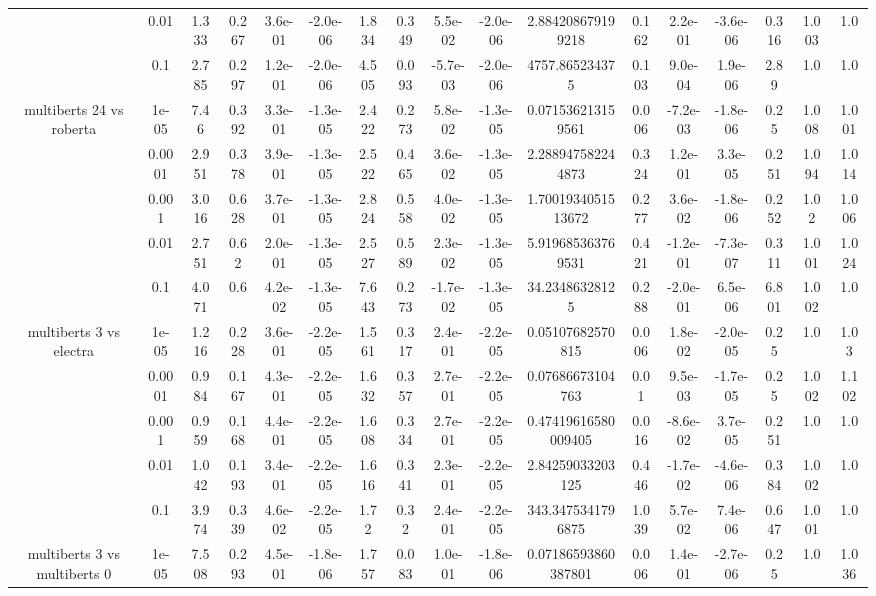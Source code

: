 \begin{tabular}{|c|c|c|c|c|c|c|c|c|c|c|c|c|c|c|c|c|}
 & 0.01 & 1.333 & 0.267 & 3.6e-01 & -2.0e-06 & 1.834 & 0.349 & 5.5e-02 & -2.0e-06 & 2.884208679199218 & 0.162 & 2.2e-01 & -3.6e-06 & 0.316 & 1.003 & 1.0 \\
 & 0.1 & 2.785 & 0.297 & 1.2e-01 & -2.0e-06 & 4.505 & 0.093 & -5.7e-03 & -2.0e-06 & 4757.865234375 & 0.103 & 9.0e-04 & 1.9e-06 & 2.89 & 1.0 & 1.0 \\
\hline
\multirow{5}{*}{multiberts 24 vs roberta } & 1e-05 & 7.46 & 0.392 & 3.3e-01 & -1.3e-05 & 2.422 & 0.273 & 5.8e-02 & -1.3e-05 & 0.071536213159561 & 0.006 & -7.2e-03 & -1.8e-06 & 0.25 & 1.008 & 1.001 \\
 & 0.0001 & 2.951 & 0.378 & 3.9e-01 & -1.3e-05 & 2.522 & 0.465 & 3.6e-02 & -1.3e-05 & 2.288947582244873 & 0.324 & 1.2e-01 & 3.3e-05 & 0.251 & 1.094 & 1.014 \\
 & 0.001 & 3.016 & 0.628 & 3.7e-01 & -1.3e-05 & 2.824 & 0.558 & 4.0e-02 & -1.3e-05 & 1.7001934051513672 & 0.277 & 3.6e-02 & -1.8e-06 & 0.252 & 1.02 & 1.006 \\
 & 0.01 & 2.751 & 0.62 & 2.0e-01 & -1.3e-05 & 2.527 & 0.589 & 2.3e-02 & -1.3e-05 & 5.919685363769531 & 0.421 & -1.2e-01 & -7.3e-07 & 0.311 & 1.001 & 1.024 \\
 & 0.1 & 4.071 & 0.6 & 4.2e-02 & -1.3e-05 & 7.643 & 0.273 & -1.7e-02 & -1.3e-05 & 34.23486328125 & 0.288 & -2.0e-01 & 6.5e-06 & 6.801 & 1.002 & 1.0 \\
\hline
\multirow{5}{*}{multiberts 3 vs electra } & 1e-05 & 1.216 & 0.228 & 3.6e-01 & -2.2e-05 & 1.561 & 0.317 & 2.4e-01 & -2.2e-05 & 0.05107682570815 & 0.006 & 1.8e-02 & -2.0e-05 & 0.25 & 1.0 & 1.03 \\
 & 0.0001 & 0.984 & 0.167 & 4.3e-01 & -2.2e-05 & 1.632 & 0.357 & 2.7e-01 & -2.2e-05 & 0.07686673104763 & 0.01 & 9.5e-03 & -1.7e-05 & 0.25 & 1.002 & 1.102 \\
 & 0.001 & 0.959 & 0.168 & 4.4e-01 & -2.2e-05 & 1.608 & 0.334 & 2.7e-01 & -2.2e-05 & 0.47419616580009405 & 0.016 & -8.6e-02 & 3.7e-05 & 0.251 & 1.0 & 1.0 \\
 & 0.01 & 1.042 & 0.193 & 3.4e-01 & -2.2e-05 & 1.616 & 0.341 & 2.3e-01 & -2.2e-05 & 2.84259033203125 & 0.446 & -1.7e-02 & -4.6e-06 & 0.384 & 1.002 & 1.0 \\
 & 0.1 & 3.974 & 0.339 & 4.6e-02 & -2.2e-05 & 1.72 & 0.32 & 2.4e-01 & -2.2e-05 & 343.3475341796875 & 1.039 & 5.7e-02 & 7.4e-06 & 0.647 & 1.001 & 1.0 \\
\hline
\multirow{5}{*}{multiberts 3 vs multiberts 0} & 1e-05 & 7.508 & 0.293 & 4.5e-01 & -1.8e-06 & 1.757 & 0.083 & 1.0e-01 & -1.8e-06 & 0.07186593860387801 & 0.006 & 1.4e-01 & -2.7e-06 & 0.25 & 1.0 & 1.036 \\

\end{tabular}

